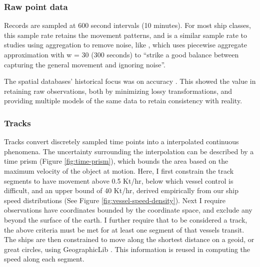 \documentclass[12pt,letterpaper]{article}
\begin{document}
\subsubsection{Raw point data}


Records are sampled at 600 second intervals (10 minutes). For most ship classes, this sample rate retains the movement patterns, and is a similar sample rate to studies using aggregation to remove noise, like \citep{Vries2009}, which uses piecewise aggregate approximation with w = 30 (300 seconds) to ``strike a good balance between capturing the general movement and ignoring noise''. %

The spatial databases' historical focus was on accuracy \citep{goodchild1989accuracy}. This showed the value in retaining raw observations, both by minimizing lossy transformations, and providing multiple models of the same data to retain consistency with reality.

\subsubsection{Tracks}

Tracks convert discretely sampled time points into a interpolated continuous phenomena. The uncertainty surrounding the interpolation can be described by a time prism (Figure \ref{fig:time-prism}), which bounds the area based on the maximum velocity of the object at motion. Here, I first constrain the track segments to have movement above 0.5 Kt/hr, below which vessel control is difficult, and an upper bound of 40 Kt/hr, derived empirically from our ship speed distributions (See Figure \ref{fig:vessel-speed-density}). Next I require observations have coordinates bounded by the coordinate space, and exclude any beyond the surface of the earth. I further require that to be considered a track, the above criteria must be met for at least one segment of that vessels transit. The ships are then constrained to move along the shortest distance on a geoid, or great circles, using GeographicLib \citep{karney2012algorithms}. This information is reused in computing the speed along each segment.
\end{document}
